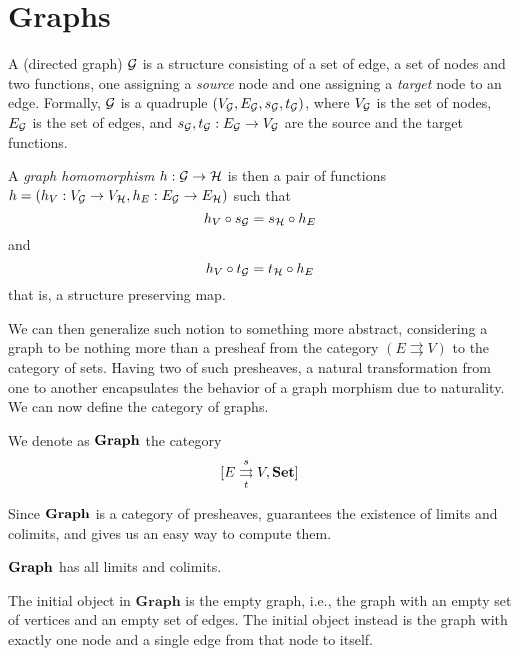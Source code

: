 \section{Graphs}\label{sect:graphs}

A (directed graph) $\mathcal{G}$ is a structure consisting of a set of edge, a set of nodes and two functions, one assigning a \emph{source} node and one assigning a \emph{target} node to an edge. Formally, $\mathcal{G}$ is a quadruple $(V_{\mathcal{G}}, E_{\mathcal{G}}, s_{\mathcal{G}}, t_{\mathcal{G}})$, where $V_{\mathcal{G}}$ is the set of nodes, $E_{\mathcal{G}}$ is the set of edges, and $s_{\mathcal{G}}, t_{\mathcal{G}}: E_{\mathcal{G}} \rightarrow V_{\mathcal{G}}$ are the source and the target functions.

A \emph{graph homomorphism} $h: \mathcal{G \rightarrow H}$ is then a pair of functions $h = (h_V: V_{\mathcal{G}} \rightarrow V_{\mathcal{H}}, h_E: E_{\mathcal{G}} \rightarrow E_{\mathcal{H}})$ such that
    \[
        h_V \circ s_{\mathcal{G}} = s_{\mathcal{H}} \circ h_E
    \]
    and
    \[
        h_V \circ t_{\mathcal{G}} = t_{\mathcal{H}} \circ h_E
    \]
that is, a structure preserving map.

We can then generalize such notion to something more abstract, considering a graph to be nothing more than a presheaf from the category $(E \rightrightarrows V)$ to the category of sets.
Having two of such presheaves, a natural transformation from one to another encapsulates the behavior of a graph morphism due to naturality. We can now define the category of graphs.

\begin{definition}\label{def:cat_of_graph}
    We denote as $\mathbf{Graph}$ the category $$[E \mathrel{\mathop{\rightrightarrows}^{s}_{t}} V , \mathbf{Set}]$$
\end{definition}

Since $\mathbf{Graph}$ is a category of presheaves,  guarantees the existence of limits and colimits, and gives us an easy way to compute them.

\begin{cor}\label{cor:graph_has_co_limits}
    $\mathbf{Graph}$ has all limits and colimits.
\end{cor}

\begin{example}\label{ex:in_term_in_graph}
    The initial object in $\mathbf{Graph}$ is the empty graph, i.e., the graph with an empty set of vertices and an empty set of edges. The initial object instead is the graph with exactly one node and a single edge from that node to itself.
\end{example}


